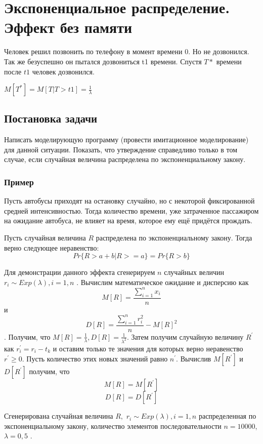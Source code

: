 \section{Экспоненциальное распределение. Эффект без памяти}
Человек решил позвонить по телефону в момент времени $ 0 $. Но не дозвонился.
Так же безуспешно он пытался дозвониться t1 времени. Спустя $ T{*} $ времени после $ t1 $ человек дозвонился. 

\begin{center}
	$M[T^{*}]=M[T\vert T>t1]=\frac{1}{\lambda}$
\end{center}

\subsection{Постановка задачи}
Написать моделирующую программу (провести имитационное моделирование)
для данной ситуации. Показать, что утверждение справедливо только
в том случае, если случайная величина распределена по экспоненциальному
закону. 

\subsubsection{Пример}
Пусть автобусы приходят на остановку случайно, но с некоторой фиксированной
средней интенсивностью. Тогда количество времени, уже затраченное
пассажиром на ожидание автобуса, не влияет на время, которое ему ещё
придётся прождать. 

Пусть случайная величина $ R $ распределена по экспоненциальному закону. Тогда верно следующее неравенство:
\[ P{r}\{R>a+b | R>=a\}=Pr\{R>b\} \]

Для демонстрации данного эффекта сгенерируем $n$ случайных величин
$r_{i}\sim Exp(\lambda),i=1,n$ . Вычислим математическое
ожидание и дисперсию как \[ M[R]=\frac{\sum_{i=1}^{n}x_{i}}{n} \]
и \[ D[R]=\frac{\sum_{i=1}^{n}r_{i}^{2}}{n}-M[R]^{2} \]. Получим, что $M[R]=\frac{1}{\lambda}, D[R]=\frac{1}{\lambda^{2}}$. Затем получим случайную величину $R^{'}$ как $r_{i}^{'}=r_{i}-t_{k}$ и оставим только те значения для которых верно неравенство $r^{'}\geq0$. Пусть количество этих новых значений равно $n^{'}$. Вычислив $M[R^{'}]$
и $D[R^{'}]$ получим, что \[ M[R]=M[R^{'}] \]
\[ D[R]=D[R^{'}] \]

Сгенерирована случайная величина $R,$ $r_{i}\sim Exp(\lambda),i=1,n$
распределенная по экспоненциальному закону, количество элементов последовательности
$n=10000$, $\lambda=0,5$ . 

